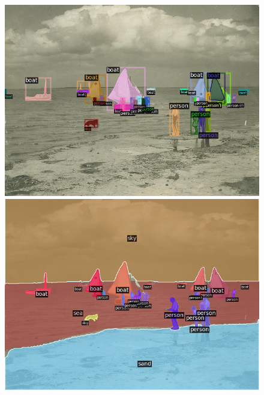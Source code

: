 \begin{figure}[h!]
    
    \begin{minipage}[b]{.45\linewidth}
    \includegraphics[width=\linewidth]{vis/success/val_663_det.png}
    \end{minipage}
    \begin{minipage}[b]{.45\linewidth}
    \includegraphics[width=\linewidth]{vis/success/val_663_pan.png}

\end{minipage}
\end{figure}
